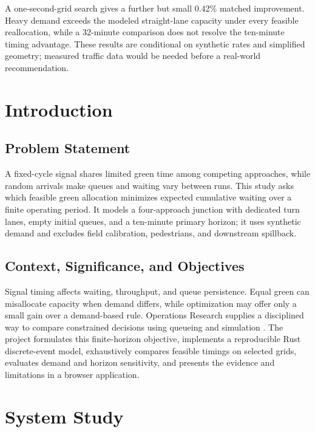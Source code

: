 \documentclass[12pt,a4paper]{report}
\begin{document}
A one-second-grid search gives a further but small 0.42\% matched improvement. Heavy demand exceeds the modeled straight-lane capacity under every feasible reallocation, while a 32-minute comparison does not resolve the ten-minute timing advantage. These results are conditional on synthetic rates and simplified geometry; measured traffic data would be needed before a real-world recommendation.
\newpage

\pagestyle{fancy}
\tableofcontents
\newpage
\listoffigures
\newpage
\listoftables
\newpage
\cleardoublepage
{}

\chapter{Introduction}
\section{Problem Statement}
A fixed-cycle signal shares limited green time among competing approaches, while random arrivals make queues and waiting vary between runs. This study asks which feasible green allocation minimizes expected cumulative waiting over a finite operating period. It models a four-approach junction with dedicated turn lanes, empty initial queues, and a ten-minute primary horizon; it uses synthetic demand and excludes field calibration, pedestrians, and downstream spillback.

\section{Context, Significance, and Objectives}
Signal timing affects waiting, throughput, and queue persistence. Equal green can misallocate capacity when demand differs, while optimization may offer only a small gain over a demand-based rule. Operations Research supplies a disciplined way to compare constrained decisions using queueing and simulation \cite{taha,saaty}. The project formulates this finite-horizon objective, implements a reproducible Rust discrete-event model, exhaustively compares feasible timings on selected grids, evaluates demand and horizon sensitivity, and presents the evidence and limitations in a browser application.

\chapter{System Study}
\end{document}
